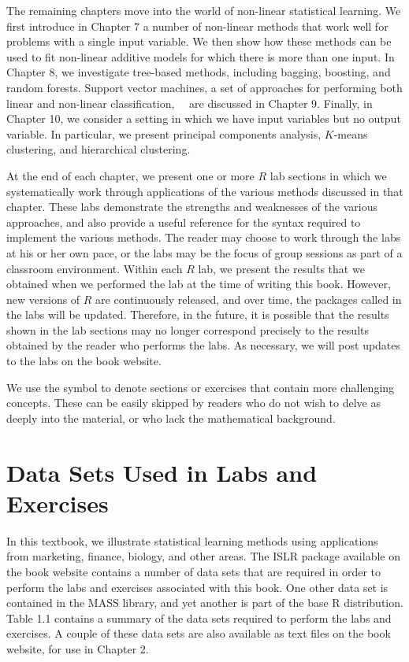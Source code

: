 \documentclass[10pt]{article}
\begin{document}
The remaining chapters move into the world of non-linear statistical learning. We first introduce in Chapter 7 a number of non-linear methods that work well for problems with a single input variable. We then show how these methods can be used to fit non-linear additive models for which there is more than one input. In Chapter 8, we investigate tree-based methods, including bagging, boosting, and random forests. Support vector machines, a set of approaches for performing both linear and non-linear classification,\
\
are discussed in Chapter 9. Finally, in Chapter 10, we consider a setting in which we have input variables but no output variable. In particular, we present principal components analysis, $K$-means clustering, and hierarchical clustering.

At the end of each chapter, we present one or more $R$ lab sections in which we systematically work through applications of the various methods discussed in that chapter. These labs demonstrate the strengths and weaknesses of the various approaches, and also provide a useful reference for the syntax required to implement the various methods. The reader may choose to work through the labs at his or her own pace, or the labs may be the focus of group sessions as part of a classroom environment. Within each $R$ lab, we present the results that we obtained when we performed the lab at the time of writing this book. However, new versions of $R$ are continuously released, and over time, the packages called in the labs will be updated. Therefore, in the future, it is possible that the results shown in the lab sections may no longer correspond precisely to the results obtained by the reader who performs the labs. As necessary, we will post updates to the labs on the book website.

We use the symbol to denote sections or exercises that contain more challenging concepts. These can be easily skipped by readers who do not wish to delve as deeply into the material, or who lack the mathematical background.

\section*{Data Sets Used in Labs and Exercises}
In this textbook, we illustrate statistical learning methods using applications from marketing, finance, biology, and other areas. The ISLR package available on the book website contains a number of data sets that are required in order to perform the labs and exercises associated with this book. One other data set is contained in the MASS library, and yet another is part of the base R distribution. Table 1.1 contains a summary of the data sets required to perform the labs and exercises. A couple of these data sets are also available as text files on the book website, for use in Chapter 2.
\end{document}
